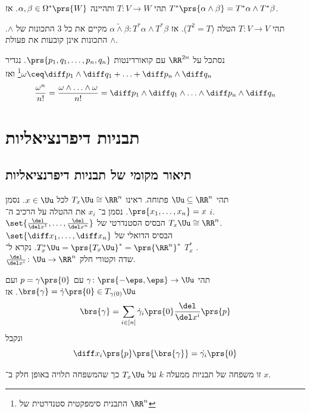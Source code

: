 \documentclass[a4paper,10pt,twoside,openany]{book}
\begin{document}
\begin{exercise}
תהי
$T \colon V \to W$
ותהיינה
$\alpha,\beta \in \Omega^*\prs{W}$.
אז
$T^*\prs{\alpha \wedge \beta} = T^*\alpha \wedge T^* \beta$.
\end{exercise}
\begin{example}
תהי
$T \colon V \to V$
הטלה ($T^2 = T$).
אז
$\alpha \tilde{\wedge} \beta \colon T^* \alpha \wedge T^* \beta$
מקיים את כל
$3$
התכונות של
$\wedge$.
התכונות אינן קובעות את פעולת
$\wedge$.
\end{example}
\begin{exercise}
נסתכל על
$\RR^{2n}$
עם קואורדינטות
$\prs{p_1, q_1, \ldots, p_n,q_n}$.
נגדיר
$\omega \ceq \diff p_1 \wedge \diff q_1+\ldots+ \diff p_n\wedge \diff q_n$\footnote{התבנית סימפקטית סטנדרטית של
$\RR^n$}
ואז
\begin{align*}
\frac{\omega^n}{n!}  = \frac{\omega \wedge \ldots \wedge \omega}{n!} = \diff p_1 \wedge \diff q_1 \wedge \ldots \wedge \diff p_n \wedge \diff q_n
\end{align*}
\end{exercise}

\section{תבניות דיפרנציאליות}
\subsection{תיאור מקומי של תבניות דיפרנציאליות}
\begin{notation}
תהי
$\Uu \subseteq \RR^n$
פתוחה. ראינו
$T_x \Uu \cong \RR^n$
לכל
$x \in \Uu$.
נסמן
$\prs{x_1, \ldots, x_n} = x$.
נסמן ב־%
$x_i$
את ההטלה על הרכיב ה־%
$i$.\\
$\set{\frac{\del}{\del x^1} , \ldots, \frac{\del}{\del x^n}}$
הבסיס הסטנדרטי של
$T_x\Uu \cong \RR^n$.\\
$\set{\diff x_1, \ldots, \diff x_n}$
הבסיס הדואלי של
$T_x^* \Uu = \prs{T_x \Uu}^* = \prs{\RR^n}^*$.
נקרא ל־%
$T_x^*$
.\\
$\frac{\del}{\del x^i} \colon \Uu \to \RR^n$
שדה וקטורי חלק.
\end{notation}

\begin{example}
תהי
$\gamma \colon \prs{-\eps,\eps} \to \Uu$
עם
$p=\gamma\prs{0}$
ועם
$\brs{\gamma} = \dot{\gamma}\prs{0} \in T_{\gamma(0)}\Uu$.
אז
\[\brs{\gamma} = \sum_{i\in[n]} \dot{\gamma}_i\prs{0} \frac{\del}{\del x^i}\prs{p}\]
ונקבל
\[\diff x_i \prs{p} \prs{\brs{\gamma}} = \dot{\gamma_i} \prs{0}\]
\end{example}
\begin{definition}
זו משפחה של תבניות ממעלה
$k$
על
$T_x\Uu$
כך שהמשפחה תלויה באופן חלק ב־%
$x$.
\end{definition}
\end{document}
